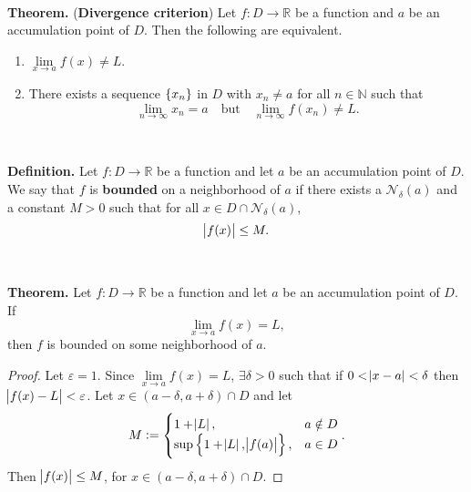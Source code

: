\documentclass[12pt,a4paper]{article}
\begin{document}
\\
\begin{tcolorbox}[colback=white]
	\textbf{Theorem.} (\textbf{Divergence criterion}) Let $f:D\to\mathbb{R}$ be a function and $a$ be an accumulation point of $D$. Then the following are equivalent.\begin{enumerate}
		\item \(\lim\limits_{x\to a}f(x)\neq L\).
		\item There exists a sequence $\set{x_n}$ in $D$ with $x_n\neq a$ for all $n\in\mathbb{N}$ such that \[
		\lim\limits_{n\to\infty}x_n=a\quad\text{but}\quad\lim\limits_{n\to\infty}f(x_n)\neq L.
		\]
	\end{enumerate}
\end{tcolorbox}\
\
\begin{tcolorbox}[colback=white]
	\textbf{Definition.} Let $f:D\to\mathbb{R}$ be a function and let $a$ be an accumulation point of $D$. We say that $f$ is \textbf{bounded} on a neighborhood of $a$ if there exists a $\mathcal{N}_\delta(a)$ and a constant $M>0$ such that for all $x\in D\cap\mathcal{N}_\delta(a)$, \[
	\abs{f(x)}\leq M.
	\]
\end{tcolorbox}
\
\begin{tcolorbox}[colback=white]
	\textbf{Theorem.} Let $f:D\to\mathbb{R}$ be a function and let $a$ be an accumulation point of $D$. If \[
	\lim\limits_{x\to a}f(x) = L,
	\] then $f$ is bounded on some neighborhood of $a$.\tcblower\begin{proof}
		Let $\varepsilon=1$. Since $\lim\limits_{x\to a}f(x)=L$, $\exists\delta>0$ such that if $0<\abs{x-a}<\delta$ then $\abs{f(x)-L}<\varepsilon$. Let $x\in(a-\delta,a+\delta)\cap D$ and let \[
		M:=\begin{cases}
		1+\abs{L}, &a\notin D \\
		\sup\set{1+\abs{L},\abs{f(a)}}, &a\in D
		\end{cases}.
		\] Then $\abs{f(x)}\leq M$, for $x\in(a-\delta,a+\delta)\cap D$.
	\end{proof}
\end{tcolorbox}
\
\end{document}
